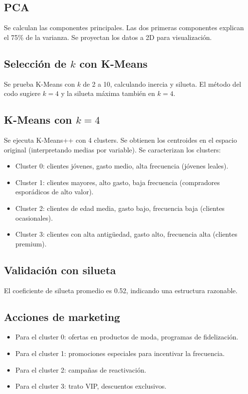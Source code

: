 \documentclass[12pt,a4paper,openany,oneside]{book}
\begin{document}
\subsection{PCA}
Se calculan las componentes principales. Las dos primeras componentes explican el 75\% de la varianza. Se proyectan los datos a 2D para visualización.

\subsection{Selección de \(k\) con K-Means}
Se prueba K-Means con \(k\) de 2 a 10, calculando inercia y silueta. El método del codo sugiere \(k=4\) y la silueta máxima también en \(k=4\).

\subsection{K-Means con \(k=4\)}
Se ejecuta K-Means++ con 4 clusters. Se obtienen los centroides en el espacio original (interpretando medias por variable). Se caracterizan los clusters:
\begin{itemize}
    \item Cluster 0: clientes jóvenes, gasto medio, alta frecuencia (jóvenes leales).
    \item Cluster 1: clientes mayores, alto gasto, baja frecuencia (compradores esporádicos de alto valor).
    \item Cluster 2: clientes de edad media, gasto bajo, frecuencia baja (clientes ocasionales).
    \item Cluster 3: clientes con alta antigüedad, gasto alto, frecuencia alta (clientes premium).
\end{itemize}

\subsection{Validación con silueta}
El coeficiente de silueta promedio es 0.52, indicando una estructura razonable.

\subsection{Acciones de marketing}
\begin{itemize}
    \item Para el cluster 0: ofertas en productos de moda, programas de fidelización.
    \item Para el cluster 1: promociones especiales para incentivar la frecuencia.
    \item Para el cluster 2: campañas de reactivación.
    \item Para el cluster 3: trato VIP, descuentos exclusivos.
\end{itemize}
\end{document}

